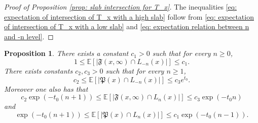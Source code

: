 \documentclass[12pt]{article}
\newtheorem{proposition}[theorem]{Proposition}
\numberwithin{equation}{section}
\newcommand{\be}{\begin{equation}}
\newcommand{\ee}{\end{equation}}
\newcommand{\1}{\mathbf{1}}
\begin{document}
\begin{proof}[Proof of Proposition \ref{prop: slab intersection for T_x}]
The inequalities \eqref{eq: expectation of intersection of T_x with a high slab} follow from \eqref{eq: expectation of intersection of T_x with a low slab} and \eqref{eq: expectation relation between n and -n level}. 
 \end{proof}
 
 
 
 \begin{proposition}\label{prop: slab intersection for the future and past}
 	There exists a constant $c_{1}>0$ such that for every $n\geq0$,
 	\be\label{eq: expectation of intersection of future of x with a low slab}
 	1\leq \mathbb{E}[|\mathfrak{F}(x,\infty)\cap L_{-n}(x)|]\leq c_{1}.
 	\ee
 	There exists  constants $c_{2},c_{3}>0$ such that for every $n\geq1$,
 	\be\label{eq: expectation of intersection of past of x with a low slab}
 	c_{2}\leq\mathbb{E}[|\mathfrak{P}(x)\cap L_{-n}(x)|]\leq c_{3}e^{t_0}.
 	\ee
 	Moreover one also has that
 	\be\label{eq: expectation of intersection of future of x with a high slab}
 	c_{2}\exp(-t_0(n+1))\leq \mathbb{E}[|\mathfrak{F}(x,\infty)\cap L_{n}(x)|]\leq c_{3}\exp(-t_0n)
 	\ee
 	and
 	\be\label{eq: expectation of intersection of past of x with a high slab}
 		\exp(-t_0(n+1))\leq \mathbb{E}[|\mathfrak{P}(x)\cap L_{n}(x)|]\leq c_{1}\exp(-t_0(n-1)).
    \ee
 
 \end{proposition}
\end{document}
